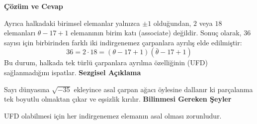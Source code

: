\documentclass[11pt, a4paper]{article}
\newenvironment{cozum}{
    \vspace{0.5cm}
    \noindent\textcolor{green!60!black}{\faCheckCircle\enspace \textbf{\Large Çözüm ve Cevap}}\par\vspace{0.2cm}
}{}
\newenvironment{sezgisel}{
    \vspace{0.5cm}
    \noindent\textcolor{orange!80!black}{\faLightbulb\enspace \textbf{\Large Sezgisel Açıklama}}\par\vspace{0.2cm}
    \itshape
}{}
\newenvironment{bilgi}{
    \vspace{0.5cm}
    \noindent\textcolor{red!70!black}{\faExclamationTriangle\enspace \textbf{\Large Bilinmesi Gereken Şeyler}}\par\vspace{0.2cm}
}{}
\begin{document}
\begin{cozum}
Ayrıca halkadaki birimsel elemanlar yalnızca $\pm 1$ olduğundan, $2$ veya $18$ elemanları $\theta - 17 + 1$ elemanının birim katı (associate) değildir. Sonuç olarak, $36$ sayısı için birbirinden farklı iki indirgenemez çarpanlara ayrılış elde edilmiştir:
\[ 36 = 2 \cdot 18 = (\theta - 17 + 1)(\bar{\theta} - 17 + 1) \]
Bu durum, halkada tek türlü çarpanlara ayrılma özelliğinin (UFD) sağlanmadığını ispatlar.
\end{cozum}
\begin{sezgisel}
Sayı dünyasına $\sqrt{-35}$ ekleyince asal çarpan ağacı öylesine dallanır ki parçalanma tek boyutlu olmaktan çıkar ve eşsizlik kırılır.
\end{sezgisel}
\begin{bilgi}
UFD olabilmesi için her indirgenemez elemanın asal olması zorunludur.
\end{bilgi}

\newpage
\end{document}
